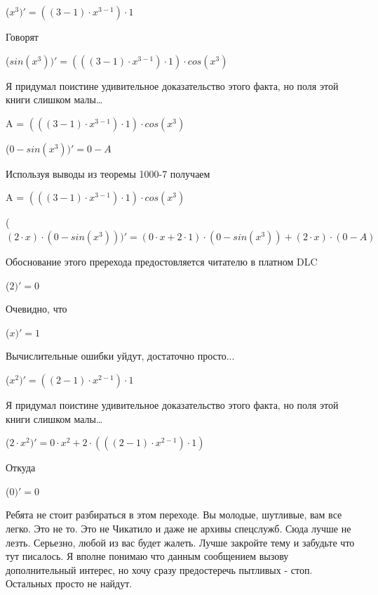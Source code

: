 \documentclass[12pt,a4paper,fleqn]{article}
\begin{document}
\begin{center}
 ($x^{3})'
  = ((3-1) \cdot x^{3-1}) \cdot 1$\end{center}
Говорят

\begin{center}
 ($sin(x^{3}))'
  = (((3-1) \cdot x^{3-1}) \cdot 1) \cdot cos(x^{3})$\end{center}
Я придумал поистине удивительное доказательство этого факта, но поля этой книги слишком малы\ldots

\begin{center}
A = $(((3-1) \cdot x^{3-1}) \cdot 1) \cdot cos(x^{3})$\end{center}
\begin{center}
 ($0-sin(x^{3}))'
  = 0-A$\end{center}
Используя выводы из теоремы 1000-7 получаем

\begin{center}
A = $(((3-1) \cdot x^{3-1}) \cdot 1) \cdot cos(x^{3})$\end{center}
\begin{center}
 ($(2 \cdot x) \cdot (0-sin(x^{3})))'
  = (0 \cdot x+2 \cdot 1) \cdot (0-sin(x^{3}))+(2 \cdot x) \cdot (0-A)$\end{center}
Обоснование этого пререхода предостовляется читателю в платном DLC

\begin{center}
 ($2)'
  = 0$\end{center}
Очевидно, что

\begin{center}
 ($x)'
  = 1$\end{center}
Вычислительные ошибки уйдут, достаточно просто...

\begin{center}
 ($x^{2})'
  = ((2-1) \cdot x^{2-1}) \cdot 1$\end{center}
Я придумал поистине удивительное доказательство этого факта, но поля этой книги слишком малы\ldots

\begin{center}
 ($2 \cdot x^{2})'
  = 0 \cdot x^{2}+2 \cdot (((2-1) \cdot x^{2-1}) \cdot 1)$\end{center}
Откуда

\begin{center}
 ($0)'
  = 0$\end{center}
Ребята не стоит разбираться в этом переходе. Вы молодые, шутливые, вам все легко. Это не то. Это не Чикатило и даже не архивы спецслужб. Сюда лучше не лезть. Серьезно, любой из вас будет жалеть. Лучше закройте тему и забудьте что тут писалось. Я вполне понимаю что данным сообщением вызову дополнительный интерес, но хочу сразу предостеречь пытливых - стоп. Остальных просто не найдут.
\end{document}
